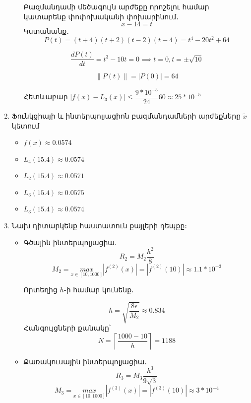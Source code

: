\documentclass{article}
\begin{document}
\begin{enumerate}
\begin{itemize}
	Բազմանդամի մեծագույն արժեքը որոշելու համար կատարենք փոփոխականի փոխարինում․
												$$x - 14 = t$$
	Կստանանք․
				$$P\left(t\right) =  \left(t+4\right) \left(t+2\right) \left(t-2\right) \left(t-4\right) = t^{4} - 20 t^{2} + 64$$

				$$ \dfrac{d P\left(t\right)}{dt} = t^{3} - 10 t = 0 \implies t = 0, t = \pm \sqrt{10}$$

				$$\lVert P\left(t\right) \rVert= \left|P\left( 0   \right)\right| = 64$$

				Հետևաբար $|f\left(x\right) - L_{3}\left(x\right)| \leq \dfrac{9 * 10^{-5}}{24} 60 \approx 25 * 10^{-5}$


\end{itemize}

\item

	Ֆունկցիայի և ինտերպոլյացիոն բազմանդամների արժեքները $\tilde{x}$ կետում

\begin{itemize}

\item  
		$f\left(x\right) \approx 0.0574$
\item
		$L_{4}\left(15.4\right) \approx 0.0574$
\item
		$L_{2}\left(15.4\right) \approx 0.0571$
\item
		$L_{3}\left(15.4\right) \approx 0.0575$
\item
		$L_{3}\left(15.4\right) \approx 0.0574$

\end{itemize}


\item 
		Նախ դիտարկենք հաստատուն քայլերի դեպքը։

\begin{itemize}

\item
Գծային ինտերպոլյացիա․
				$$R_{2} = M_{2} \dfrac{h^{2}}{8}$$
				$$M_{2} = \underset{x \in \left[10, 1000\right]}{max}\left|f^{\left(2\right)}\left(x\right)\right| = \left|f^{\left(2\right)}\left(10\right)\right| \approx 1.1 * 10^{-3}$$

Որտեղից $h$֊ի համար կունենք․

				$$ h = \sqrt{\dfrac{8 \epsilon}{M_{2}}} \approx 0.834$$
				Հանգույցների քանակը՝ $$N = \left \lceil{\dfrac{1000 - 10}{h}} \right \rceil = 1188$$
\item
Քառակուսային ինտերպոլյացիա․
				$$R_{3} = M_{3} \dfrac{h^{3}}{9 \sqrt{3}}$$
				$$M_{3} = \underset{x \in \left[10, 1000\right]}{max}\left|f^{\left(3\right)}\left(x\right)\right| = \left|f^{\left(3\right)}\left(10\right)\right| \approx 3 * 10^{-4}$$


\end{itemize}
\end{enumerate}
\end{document}
